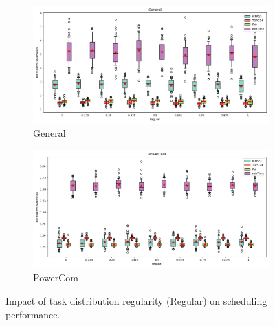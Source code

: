 \documentclass{article}
\begin{document}
\begin{figure}[htbp]
\\[2ex]
\begin{subfigure}[b]{0.32\textwidth}\includegraphics[width=\textwidth]{Results/Regular/Regular_General_boxplot}\caption{General}\label{fig:boxplot_figures_Regular_General}\end{subfigure}
\hfill
\begin{subfigure}[b]{0.32\textwidth}\includegraphics[width=\textwidth]{Results/Regular/Regular_PowerCom_boxplot}\caption{PowerCom}\label{fig:boxplot_figures_Regular_PowerCom}\end{subfigure}
\hfill
\caption{Impact of task distribution regularity (Regular) on scheduling performance.}
\label{fig:boxplot_figures_Regular}
\end{figure}
\end{document}
